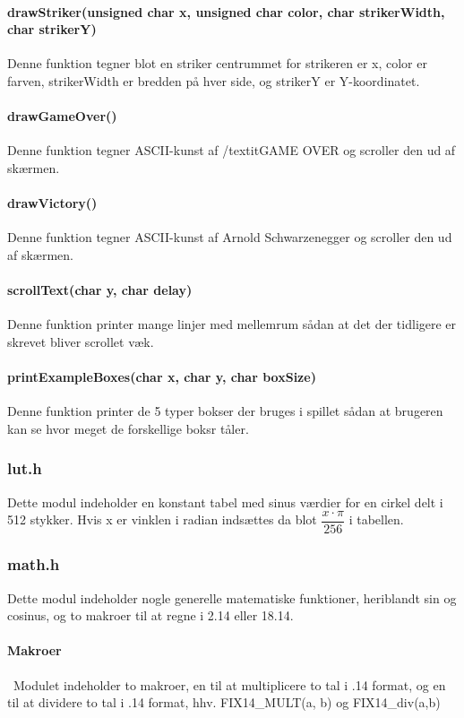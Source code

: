 \paragraph{drawStriker(unsigned char x, unsigned char color, char strikerWidth, char strikerY)}
Denne funktion tegner blot en striker centrummet for strikeren er x, color er farven, strikerWidth er bredden på hver side, og strikerY er Y-koordinatet.

\paragraph{drawGameOver()}
Denne funktion tegner ASCII-kunst af /textit{GAME OVER} og scroller den ud af skærmen.

\paragraph{drawVictory()}
Denne funktion tegner ASCII-kunst af Arnold Schwarzenegger og scroller den ud af skærmen.

\paragraph{scrollText(char y, char delay)}
Denne funktion printer mange linjer med mellemrum sådan at det der tidligere er skrevet bliver scrollet væk.

\paragraph{printExampleBoxes(char x, char y, char boxSize)}
Denne funktion printer de 5 typer bokser der bruges i spillet sådan at brugeren kan se hvor meget de forskellige boksr tåler.

\subsubsection{lut.h}
\label{lut}
Dette modul indeholder en konstant tabel med sinus værdier for en cirkel delt i 512 stykker. Hvis x er vinklen i radian indsættes da blot $\dfrac{x\cdot \pi}{256}$ i tabellen.
\subsubsection{math.h}
Dette modul indeholder nogle generelle matematiske funktioner, heriblandt sin og cosinus, og to makroer til at regne i 2.14 eller 18.14.
\paragraph{Makroer}\
Modulet indeholder to makroer, en til at multiplicere to tal i .14 format, og en til at dividere to tal i .14 format, hhv. FIX14\_MULT(a, b) og FIX14\_div(a,b)

